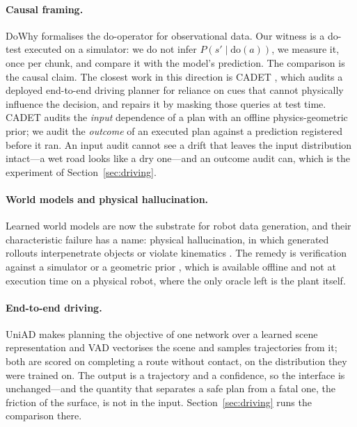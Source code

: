 \documentclass[conference]{IEEEtran}
\theoremstyle{definition}
\begin{document}
\paragraph{Causal framing.} DoWhy \cite{sharma2020dowhy} formalises the
do-operator for observational data. Our witness is a do-test executed on a
simulator: we do not infer $P(s'\mid \mathrm{do}(a))$, we measure it, once per
chunk, and compare it with the model's prediction. The comparison is the causal
claim. The closest work in this direction is CADET \cite{guo2026cadet}, which
audits a deployed end-to-end driving planner for reliance on cues that cannot
physically influence the decision, and repairs it by masking those queries at
test time. CADET audits the \emph{input} dependence of a plan with an offline
physics-geometric prior; we audit the \emph{outcome} of an executed plan against
a prediction registered before it ran. An input audit cannot see a drift that
leaves the input distribution intact---a wet road looks like a dry one---and an
outcome audit can, which is the experiment of Section~\ref{sec:driving}.

\paragraph{World models and physical hallucination.} Learned world models
\cite{ha2018worldmodels} are now the substrate for robot data generation, and
their characteristic failure has a name: physical hallucination, in which
generated rollouts interpenetrate objects or violate kinematics
\cite{zhou2026groundeddreamer}. The remedy is verification against a simulator
or a geometric prior \cite{zhou2026groundeddreamer, lu2026causalplan}, which is
available offline and not at execution time on a physical robot, where the only
oracle left is the plant itself.

\paragraph{End-to-end driving.} UniAD \cite{hu2023uniad} makes planning the
objective of one network over a learned scene representation and VAD
\cite{chen2023vad} vectorises the scene and samples trajectories from it; both
are scored on completing a route without contact, on the distribution they were
trained on. The output is a trajectory and a confidence, so the interface is
unchanged---and the quantity that separates a safe plan from a fatal one, the
friction of the surface, is not in the input. Section~\ref{sec:driving} runs
the comparison there.
\end{document}
